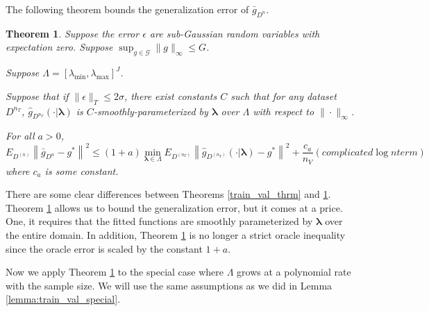 \documentclass[12pt]{article}
\newtheorem{theorem}{Theorem}
\begin{document}
The following theorem bounds the generalization error of $\bar{g}_{D^{n}}$.
\begin{theorem}
\label{thrm:kfold}
Suppose the error $\epsilon$ are sub-Gaussian random variables with expectation zero.
Suppose $\sup_{g \in \mathcal{G}} \|g\|_\infty \le G$.

Suppose $\Lambda = [\lambda_{\min}, \lambda_{\max}]^J$.

Suppose that if $\|\epsilon\|_{T}\le 2\sigma$, there exist constants $C$ such that for any dataset $D^{n_T}$, $\hat{g}_{D^{n_T}}(\cdot | \boldsymbol \lambda)$ is $C$-smoothly-parameterized by $\boldsymbol \lambda$ over $\Lambda$ with respect to $\| \cdot \|_\infty$.

For all $a > 0$,
\begin{equation}
E_{D^{(n)}} \left \| \bar{g}_{D^{n}} - g^* \right \|^2 \le
(1+a) \min_{\boldsymbol{\lambda} \in \Lambda}  E_{D^{(n_T)}} \left \| \hat{g}_{D^{(n_T)}}(\cdot |\boldsymbol \lambda) - g^* \right \|^2
+  \frac{c_a}{n_V} \left (complicated \log n term \right )
\end{equation}
where $c_a$ is some constant.
\end{theorem}

There are some clear differences between Theorems \ref{train_val_thrm} and \ref{thrm:kfold}. Theorem \ref{thrm:kfold} allows us to bound the generalization error, but it comes at a price. One, it requires that the fitted functions are smoothly parameterized by $\boldsymbol{\lambda}$ over the entire domain. In addition, Theorem \ref{thrm:kfold} is no longer a strict oracle inequality since the oracle error is scaled by the constant $1+a$.

Now we apply Theorem \ref{thrm:kfold} to the special case where $\Lambda$ grows at a polynomial rate with the sample size. We will use the same assumptions as we did in Lemma \ref{lemma:train_val_special}.
\end{document}
